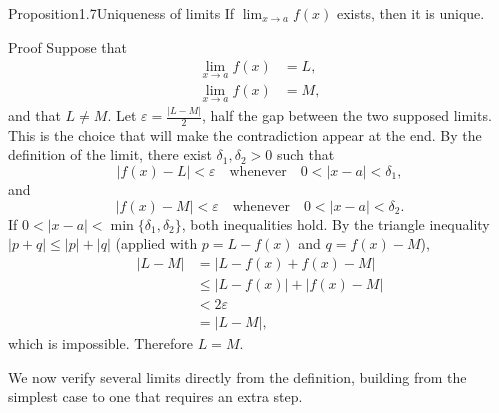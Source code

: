 \documentclass[a4paper,12pt,oneside]{memoir}
\begin{document}
\begin{envproposition}{Proposition}{1.7}{Uniqueness of limits}
If \(\lim_{x \to a} f(x)\) exists, then it is unique.
\end{envproposition}
\begin{envproof}{Proof}{}{}
Suppose that \[ \begin{aligned} \lim_{x \to a} f(x) &= L,\\ \lim_{x \to a} f(x) &= M, \end{aligned} \] and that \(L \neq M\). Let \(\varepsilon = \tfrac{|L - M|}{2}\), half the gap between the two supposed limits. This is the choice that will make the contradiction appear at the end. By the definition of the limit, there exist \(\delta_{1}, \delta_{2} > 0\) such that \[ |f(x) - L| < \varepsilon \quad \text{whenever} \quad 0 < |x - a| < \delta_{1}, \] and \[ |f(x) - M| < \varepsilon \quad \text{whenever} \quad 0 < |x - a| < \delta_{2}. \] If \(0 < |x - a| < \min\{\delta_{1}, \delta_{2}\}\), both inequalities hold. By the triangle inequality \(|p + q| \le |p| + |q|\) (applied with \(p = L - f(x)\) and \(q = f(x) - M\)), \[ \begin{aligned} |L - M| &= |L - f(x) + f(x) - M|\\ &\le |L - f(x)| + |f(x) - M|\\ &< 2\varepsilon\\ &= |L - M|, \end{aligned} \] which is impossible. Therefore \(L = M\).
\end{envproof}
We now verify several limits directly from the definition, building from the simplest case to one that requires an extra step.
\end{document}
